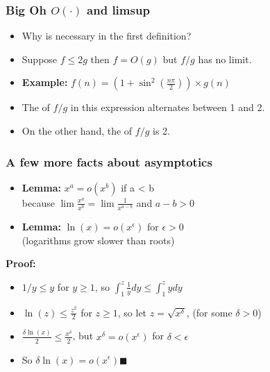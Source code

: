 \documentclass{beamer}
\begin{document}
\begin{frame}
  \frametitle{Big Oh $O(\cdot)$ and limsup}

  {\larger
    \begin{itemize}
    \item Why is  necessary in the first definition?
    \item Suppose $f \leq 2g$ then $f = O(g)$ but $f/g$ has no limit.
      \bigskip

    \item {\bf Example:} $f(n) = (1+\sin^2(\frac{n\pi}{2}))\times g(n)$
      \bigskip
      
    \item The  of $f/g$ in this expression alternates
      between 1 and 2.
    \item On the other hand, the  of $f/g$ is 2.
    \end{itemize}
  }
\end{frame}

\begin{frame}
  \frametitle{A few more facts about asymptotics}

  {\larger

    \begin{itemize}
    \item {\bf Lemma:} $x^a = o(x^b)$ if a < b\\
      \hfill because $\lim\frac{x^a}{x^b} = \lim\frac{1}{x^{a-b}}$ and $a-b > 0$
      \bigskip

    \item {\bf Lemma:} $\ln(x) = o(x^\epsilon)$ for $\epsilon > 0$\\
      \hfill (logarithms grow slower than roots)
    \end{itemize}

    {\bf Proof:}
    \begin{itemize}
    \item $1/y \leq y$ for $y \geq 1$, so $\int_1^z \frac{1}{y}dy \leq \int_1^z ydy$
    \item $\ln(z) \leq \frac{z^2}{2}$ for $z \geq 1$, so let $z =
      \sqrt{x^\delta}$, (for some $\delta > 0$)
    \item $\frac{\delta\ln(x)}{2} \leq \frac{x^\delta}{2}$, but
      $x^\delta = o(x^\epsilon)$ for $\delta < \epsilon$
    \item So $\delta\ln(x) = o(x^\epsilon)$\hfill $\blacksquare$
    \end{itemize}

  }
\end{frame}
\end{document}

